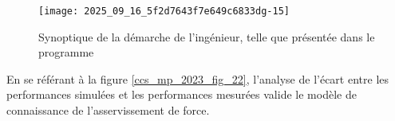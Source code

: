 

\begin{figure}[!h]
\centering
\texttt{[image: 2025\_09\_16\_5f2d7643f7e649c6833dg-15]}
\caption{\label{ccs_mp_2023_fig_23}Synoptique de la démarche de l'ingénieur, telle que présentée dans le programme}
\end{figure}


En se référant à la figure \ref{ccs_mp_2023_fig_22}, l'analyse de l'écart entre les performances simulées et les performances mesurées valide le modèle de connaissance de l'asservissement de force.\\
\fi

